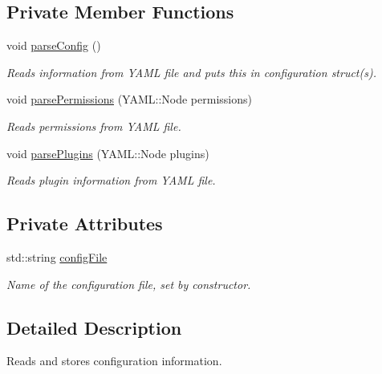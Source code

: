 \subsection*{Private Member Functions}
\begin{DoxyCompactItemize}
\item 
\hypertarget{classConfig_a2ddcecec4284da0fb0b53da77e0d217a}{void \hyperlink{classConfig_a2ddcecec4284da0fb0b53da77e0d217a}{parse\-Config} ()}\label{classConfig_a2ddcecec4284da0fb0b53da77e0d217a}

\begin{DoxyCompactList}\small\item\em Reads information from Y\-A\-M\-L file and puts this in configuration struct(s). \end{DoxyCompactList}\item 
void \hyperlink{classConfig_a9f957b8967cbbc7123a105f71a7e0902}{parse\-Permissions} (Y\-A\-M\-L\-::\-Node permissions)
\begin{DoxyCompactList}\small\item\em Reads permissions from Y\-A\-M\-L file. \end{DoxyCompactList}\item 
void \hyperlink{classConfig_ab9bb8a0097656a79ef88fd125d7e5626}{parse\-Plugins} (Y\-A\-M\-L\-::\-Node plugins)
\begin{DoxyCompactList}\small\item\em Reads plugin information from Y\-A\-M\-L file. \end{DoxyCompactList}\end{DoxyCompactItemize}
\subsection*{Private Attributes}
\begin{DoxyCompactItemize}
\item 
\hypertarget{classConfig_a08b7b2c4eadf7dda51404f76fd6e0280}{std\-::string \hyperlink{classConfig_a08b7b2c4eadf7dda51404f76fd6e0280}{config\-File}}\label{classConfig_a08b7b2c4eadf7dda51404f76fd6e0280}

\begin{DoxyCompactList}\small\item\em Name of the configuration file, set by constructor. \end{DoxyCompactList}\end{DoxyCompactItemize}


\subsection{Detailed Description}
Reads and stores configuration information. 

